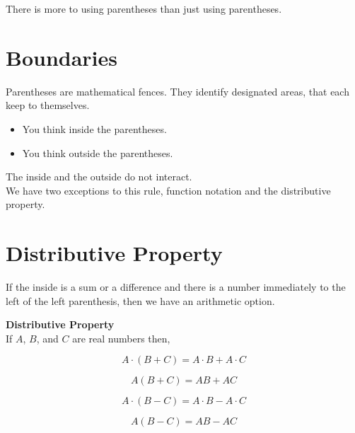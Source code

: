 \documentclass{ximera}
\begin{document}
There is more to using parentheses than just using parentheses. \\



\section{Boundaries}


Parentheses are mathematical fences.  They identify designated areas, that each keep to themselves. \\

\begin{itemize}
\item You think inside the parentheses. 
\item You think outside the parentheses. 
\end{itemize}



The inside and the outside do not interact. \\


We have two exceptions to this rule, function notation and the distributive property. \\












\section{Distributive Property}


If the inside is a sum or a difference and there is a number immediately to the left of the left parenthesis, then we have an arithmetic option.


\begin{notation}  \textbf{\textcolor{blue!55!black}{Distributive Property}} \\


If $A$, $B$, and $C$ are real numbers then,

\[
A \cdot (B + C) = A \cdot B + A \cdot C
\]


\[
A (B + C) = A  B + A  C
\]


\[
A \cdot (B - C) = A \cdot B - A \cdot C
\]


\[
A (B - C) = A  B - A  C
\]




\end{notation}
\end{document}

